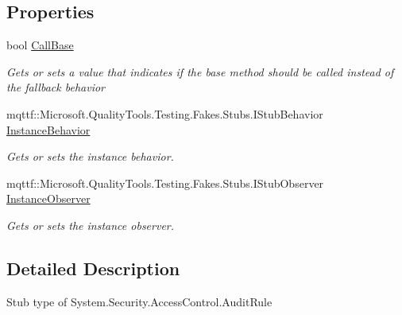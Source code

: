 \subsection*{Properties}
\begin{DoxyCompactItemize}
\item 
bool \hyperlink{class_system_1_1_security_1_1_access_control_1_1_fakes_1_1_stub_audit_rule_adff96ae874b6bdd6fd0f4a9afff5637b}{Call\-Base}
\begin{DoxyCompactList}\small\item\em Gets or sets a value that indicates if the base method should be called instead of the fallback behavior\end{DoxyCompactList}\item 
mqttf\-::\-Microsoft.\-Quality\-Tools.\-Testing.\-Fakes.\-Stubs.\-I\-Stub\-Behavior \hyperlink{class_system_1_1_security_1_1_access_control_1_1_fakes_1_1_stub_audit_rule_a1b7da346a59216b6c1e1f29e0ac3e234}{Instance\-Behavior}
\begin{DoxyCompactList}\small\item\em Gets or sets the instance behavior.\end{DoxyCompactList}\item 
mqttf\-::\-Microsoft.\-Quality\-Tools.\-Testing.\-Fakes.\-Stubs.\-I\-Stub\-Observer \hyperlink{class_system_1_1_security_1_1_access_control_1_1_fakes_1_1_stub_audit_rule_aaec2f183b714677c26179b1af66838ca}{Instance\-Observer}
\begin{DoxyCompactList}\small\item\em Gets or sets the instance observer.\end{DoxyCompactList}\end{DoxyCompactItemize}


\subsection{Detailed Description}
Stub type of System.\-Security.\-Access\-Control.\-Audit\-Rule




